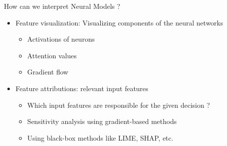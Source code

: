 \documentclass[aspectratio=169]{../latex_main/tntbeamer}
\begin{document}
\begin{frame}[c]{How can we interpret Neural Models ?}
	\begin{itemize}
		\item Feature visualization: Visualizing components of the neural networks
		\begin{itemize}
			\item Activations of neurons
			\item Attention values
			\item Gradient flow
		\end{itemize}
		\item Feature attributions: relevant input features
		\begin{itemize}
			\item Which input features are responsible for the given decision ?
			\item Sensitivity analysis using gradient-based methods
			\item Using black-box methods like LIME, SHAP, etc.
		\end{itemize}
	\end{itemize}
\end{frame}
\end{document}
